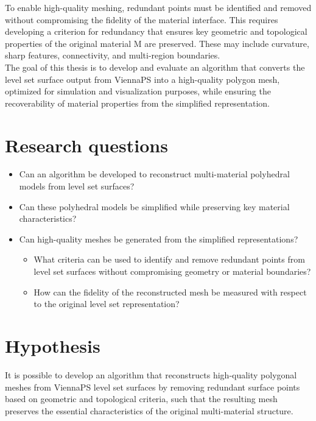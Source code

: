 \documentclass[submission]{eptcs}
\begin{document}
To enable high-quality meshing, redundant points must be identified and removed without compromising the fidelity of the material interface. This requires developing a criterion for redundancy that ensures key geometric and topological properties of the original material M are preserved. These may include curvature, sharp features, connectivity, and multi-region boundaries. \\

The goal of this thesis is to develop and evaluate an algorithm that converts the level set surface output from ViennaPS into a high-quality polygon mesh, optimized for simulation and visualization purposes, while ensuring the recoverability of material properties from the simplified representation.

\section{Research questions}

\begin{itemize}
    \item Can an algorithm be developed to reconstruct multi-material polyhedral models from level set surfaces?
    \item Can these polyhedral models be simplified while preserving key material characteristics?
    \item Can high-quality meshes be generated from the simplified representations?
        \begin{itemize}
    \item What criteria can be used to identify and remove redundant points from level set surfaces without compromising geometry or material boundaries?
    \item How can the fidelity of the reconstructed mesh be measured with respect to the original level set representation?
\end{itemize}
\end{itemize}


\section{Hypothesis}

It is possible to develop an algorithm that reconstructs high-quality polygonal meshes from ViennaPS level set surfaces by removing redundant surface points based on geometric and topological criteria, such that the resulting mesh preserves the essential characteristics of the original multi-material structure.
\end{document}
